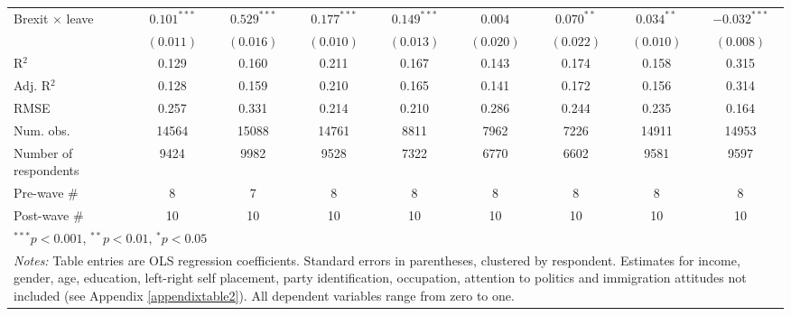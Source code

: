 \documentclass[12pt, letter]{article}
\begin{document}
\begin{table}[t]
\begin{center}
{\begin{tabular}{l c c c c c c c c }
Brexit $\times$ leave            & $0.101^{***}$  & $0.529^{***}$  & $0.177^{***}$  & $0.149^{***}$  & $0.004$        & $0.070^{**}$   & $0.034^{**}$   & $-0.032^{***}$ \\
                                 & $(0.011)$      & $(0.016)$      & $(0.010)$      & $(0.013)$      & $(0.020)$      & $(0.022)$      & $(0.010)$      & $(0.008)$      \\
\hline
R$^2$                            & 0.129          & 0.160          & 0.211          & 0.167          & 0.143          & 0.174          & 0.158          & 0.315          \\
Adj. R$^2$                       & 0.128          & 0.159          & 0.210          & 0.165          & 0.141          & 0.172          & 0.156          & 0.314          \\
RMSE                             & 0.257          & 0.331          & 0.214          & 0.210          & 0.286          & 0.244          & 0.235          & 0.164          \\
\hline
Num. obs.                        & 14564          & 15088          & 14761          & 8811           & 7962           & 7226           & 14911          & 14953          \\
Number of respondents & 9424 & 9982 & 9528 & 7322 & 6770 & 6602 & 9581 & 9597 \\ 
Pre-wave \# & 8 & 7 & 8 & 8 & 8 & 8 & 8 & 8 \\ 
Post-wave \# & 10 & 10 & 10 & 10 & 10 & 10 & 10 & 10 \\ 
\toprule[1.5pt]
\multicolumn{9}{l}{\scriptsize{$^{***}p<0.001$, $^{**}p<0.01$, $^*p<0.05$}} \\
\multicolumn{9}{l}{\multirow{3}{650pt}{\footnotesize{\textit{Notes:} Table entries are OLS regression coefficients. Standard errors in parentheses, clustered by respondent. Estimates for income, gender, age, education, left-right self placement, party identification, occupation, attention to politics and immigration attitudes not included (see Appendix \ref{appendixtable2}). All dependent variables range from zero to one.}}} \\
\end{tabular}}
\end{center}
\end{table}
\end{document}

